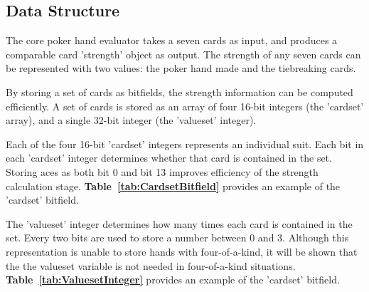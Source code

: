 



\subsection{Data Structure}
\label{sec:DataStructure}

The core poker hand evaluator takes a seven cards as input, and produces a comparable card 'strength' object as output.
The strength of any seven cards can be represented with two values: the poker hand made and the tiebreaking cards.

By storing a set of cards as bitfields, the strength information can be computed efficiently.
A set of cards is stored as an array of four 16-bit integers (the 'cardset' array), and a single 32-bit integer (the 'valueset' integer).

Each of the four 16-bit 'cardset' integers represents an individual suit.
Each bit in each 'cardset' integer determines whether that card is contained in the set.
Storing aces as both bit 0 and bit 13 improves efficiency of the strength calculation stage.
\textbf{Table~\ref{tab:CardsetBitfield}} provides an example of the 'cardset' bitfield.

The 'valueset' integer determines how many times each card is contained in the set.
Every two bits are used to store a number between 0 and 3.
Although this representation is unable to store hands with four-of-a-kind, it will be shown that the the valueset variable is not needed in four-of-a-kind situations.
\textbf{Table~\ref{tab:ValuesetInteger}} provides an example of the 'cardset' bitfield.

